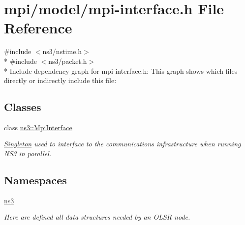 \hypertarget{mpi-interface_8h}{}\section{mpi/model/mpi-\/interface.h File Reference}
\label{mpi-interface_8h}
{\ttfamily \#include $<$ns3/nstime.\+h$>$}\\*
{\ttfamily \#include $<$ns3/packet.\+h$>$}\\*
Include dependency graph for mpi-\/interface.h\+:
This graph shows which files directly or indirectly include this file\+:
\subsection*{Classes}
\begin{DoxyCompactItemize}
\item 
class \hyperlink{classns3_1_1MpiInterface}{ns3\+::\+Mpi\+Interface}
\begin{DoxyCompactList}\small\item\em \hyperlink{classns3_1_1Singleton}{Singleton} used to interface to the communications infrastructure when running N\+S3 in parallel. \end{DoxyCompactList}\end{DoxyCompactItemize}
\subsection*{Namespaces}
\begin{DoxyCompactItemize}
\item 
 \hyperlink{namespacens3}{ns3}
\begin{DoxyCompactList}\small\item\em Here are defined all data structures needed by an O\+L\+SR node. \end{DoxyCompactList}\end{DoxyCompactItemize}
